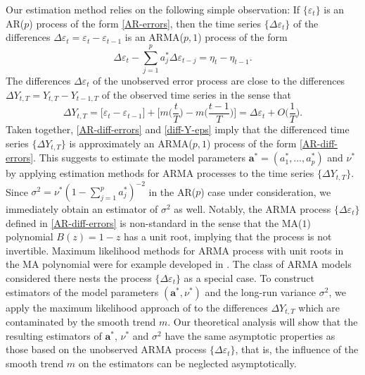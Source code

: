 Our estimation method relies on the following simple observation: If $\{\varepsilon_t\}$ is an AR($p$) process of the form \eqref{AR-errors}, then the time series $\{ \Delta \varepsilon_t \}$ of the differences $\Delta \varepsilon_t = \varepsilon_t - \varepsilon_{t-1}$ is an ARMA($p,1$) process of the form 
\begin{equation}\label{AR-diff-errors} 
\Delta \varepsilon_t - \sum_{j=1}^p a_j^* \Delta \varepsilon_{t-j} = \eta_t - \eta_{t-1}. 
\end{equation}
The differences $\Delta \varepsilon_t$ of the unobserved error process are close to the differences $\Delta Y_{t,T} = Y_{t,T} - Y_{t-1,T}$ of the observed time series in the sense that 
\begin{equation}\label{diff-Y-eps}
\Delta Y_{t,T} = \big[\varepsilon_t  - \varepsilon_{t-1} \big] + \Big[ m \Big(\frac{t}{T}\Big) - m \Big(\frac{t-1}{T}\Big) \Big] = \Delta \varepsilon_t + O \Big( \frac{1}{T} \Big).  
\end{equation} 
Taken together, \eqref{AR-diff-errors} and \eqref{diff-Y-eps} imply that the differenced time series $\{ \Delta Y_{t,T} \}$ is approximately an ARMA($p,1$) process of the form \eqref{AR-diff-errors}. This suggests to estimate the model parameters $\boldsymbol{a}^* = (a_1^*,\ldots,a_p^*)$ and $\nu^*$ by applying estimation methods for ARMA processes to the time series $\{ \Delta Y_{t,T} \}$. Since $\sigma^2 = \nu^* ( 1-\sum_{j=1}^p a_j^*)^{-2}$ in the AR($p$) case under consideration, we immediately obtain an estimator of $\sigma^2$ as well. Notably, the ARMA process $\{ \Delta \varepsilon_t \}$ defined in \eqref{AR-diff-errors} is non-standard in the sense that the MA($1$) polynomial $B(z) = 1 - z$ has a unit root, implying that the process is not invertible. Maximum likelihood methods for ARMA process with unit roots in the MA polynomial were for example developed in \cite{PhamDinh1978}. The class of ARMA models considered there nests the process $\{ \Delta \varepsilon_t \}$ as a special case. To construct estimators of the model parameters $(\boldsymbol{a}^*,\nu^*)$ and the long-run variance $\sigma^2$, we apply the maximum likelihood approach of \cite{PhamDinh1978} to the differences $\Delta Y_{t,T}$ which are contaminated by the smooth trend $m$. Our theoretical analysis will show that the resulting estimators of $\boldsymbol{a}^*$, $\nu^*$ and $\sigma^2$ have the same asymptotic properties as those based on the unobserved ARMA process $\{\Delta \varepsilon_t\}$, that is, the influence of the smooth trend $m$ on the estimators can be neglected asymptotically. 


